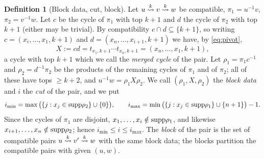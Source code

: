 \documentclass{amsart}
\theoremstyle{definition}
\newtheorem{definition}[lemma]{Definition}
\theoremstyle{remark}
\numberwithin{equation}{section}
\newcommand{\xrightsquigarrow}[2][]{%
	\mathrel{\mathop{\rightsquigarrow}\limits^{\scriptstyle #2}%
	\ifx\hfuzz#1\hfuzz\else_{\scriptstyle #1}\fi}%
}
\newcommand{\tom}[1]{\ensuremath{\xrightsquigarrow{#1}}}
\begin{document}
\begin{definition}[Block data, cut, block] \label{def:blockdata}
Let $u\tom{k}v\tom{k}w$ be compatible, $\pi_1=u^{-1}v$, $\pi_2=v^{-1}w$. Let $c$ be the cycle of $\pi_1$ with top $k+1$ and $d$ the cycle of $\pi_2$ with top $k+1$ (either may be trivial). By compatibility $c\cap d\subseteq\{k+1\}$, so writing $c=(x_i,\ldots,x_1,k+1)$ and $d=(x_n,\ldots,x_{i+1},k+1)$ we have, by \eqref{eq:pivot},
$$X:=cd=t_{x_1,k+1}\cdots t_{x_n,k+1}=(x_n,\ldots,x_1,k+1),$$
a cycle with top $k+1$ which we call the \emph{merged cycle} of the pair. Let $\rho_1=\pi_1c^{-1}$ and $\rho_2=d^{-1}\pi_2$ be the products of the remaining cycles of $\pi_1$ and of $\pi_2$; all of these have tops $\geq k+2$, and $u^{-1}w=\rho_1X\rho_2$. We call $(\rho_1,X,\rho_2)$ the \emph{block data} and $i$ the \emph{cut} of the pair, and we put
$$i_{\min}=\max\big(\{j:x_j\in\mathrm{supp}\rho_2\}\cup\{0\}\big),\qquad i_{\max}=\min\big(\{j:x_j\in\mathrm{supp}\rho_1\}\cup\{n+1\}\big)-1.$$
Since the cycles of $\pi_1$ are disjoint, $x_1,\ldots,x_i\notin\mathrm{supp}\rho_1$, and likewise $x_{i+1},\ldots,x_n\notin\mathrm{supp}\rho_2$; hence $i_{\min}\leq i\leq i_{\max}$. The \emph{block} of the pair is the set of compatible pairs $u\tom{k}v'\tom{k}w$ with the same block data; the blocks partition the compatible pairs with given $(u,w)$.
\end{definition}
\end{document}
